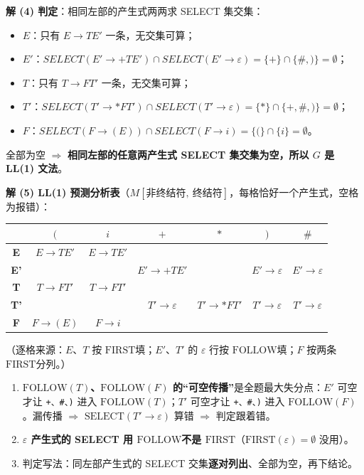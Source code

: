 \documentclass[12pt,a4paper,fontset=windows]{ctexart}
\newcommand{\FR}[1]{\ensuremath{\mathrm{FIRST}(#1)}}
\newcommand{\FO}[1]{\ensuremath{\mathrm{FOLLOW}(#1)}}
\newcommand{\FRname}{\ensuremath{\mathrm{FIRST}}}
\newcommand{\FOname}{\ensuremath{\mathrm{FOLLOW}}}
\newcommand{\imp}{\ensuremath{\Rightarrow}}
\begin{document}
\textbf{解 (4) 判定}：相同左部的产生式两两求 SELECT 集交集：
\begin{itemize}
\item $E$：只有 $E \to TE'$ 一条，无交集可算；
\item $E'$：$SELECT(E' \to +TE') \cap SELECT(E' \to \varepsilon) = \{+\} \cap \{\#, )\} = \emptyset$；
\item $T$：只有 $T \to FT'$ 一条，无交集可算；
\item $T'$：$SELECT(T' \to {*}FT') \cap SELECT(T' \to \varepsilon) = \{*\} \cap \{+,\#, )\} = \emptyset$；
\item $F$：$SELECT(F \to (E)) \cap SELECT(F \to i) = \{( \} \cap \{i\} = \emptyset$。
\end{itemize}
全部为空 \imp{} \textbf{相同左部的任意两产生式 SELECT 集交集为空，所以 $G$ 是 LL(1) 文法}。

\textbf{解 (5) LL(1) 预测分析表}（$M[\text{非终结符},\ \text{终结符}]$，每格恰好一个产生式，空格为报错）：

\begin{center}
\renewcommand{\arraystretch}{1.3}
\begin{tabular}{c|cccccc}
\toprule
        & $($          & $i$       & $+$            & $*$             & $)$           & $\#$ \\
\midrule
\textbf{E}  & $E \to TE'$ & $E \to TE'$ &                &                 &               & \\
\textbf{E'} &             &             & $E' \to +TE'$  &                 & $E' \to \varepsilon$ & $E' \to \varepsilon$ \\
\textbf{T}  & $T \to FT'$ & $T \to FT'$ &                &                 &               & \\
\textbf{T'} &             &             & $T' \to \varepsilon$ & $T' \to *FT'$ & $T' \to \varepsilon$ & $T' \to \varepsilon$ \\
\textbf{F}  & $F \to (E)$ & $F \to i$   &                &                 &               & \\
\bottomrule
\end{tabular}
\end{center}

（逐格来源：$E$、$T$ 按 \FRname 填；$E'$、$T'$ 的 $\varepsilon$ 行按 \FOname 填；$F$ 按两条 \FRname 分列。）

\begin{warnbox}
\begin{enumerate}
\item \textbf{\FO{T}、\FO{F} 的``可空传播''}是全题最大失分点：$E'$ 可空才让 \texttt{+、\#、)} 进入 \FO{T}；$T'$ 可空才让 \texttt{+、\#、)} 进入 \FO{F}。漏传播 \imp{} $\mathrm{SELECT}(T' \to \varepsilon)$ 算错 \imp{} 判定跟着错。
\item \textbf{$\varepsilon$ 产生式的 SELECT 用 \FOname 不是 \FRname}（$\FR{\varepsilon} = \emptyset$ 没用）。
\item 判定写法：同左部产生式的 SELECT 交集\textbf{逐对列出}、全部为空，再下结论。
\end{enumerate}
\end{warnbox}
\end{document}
